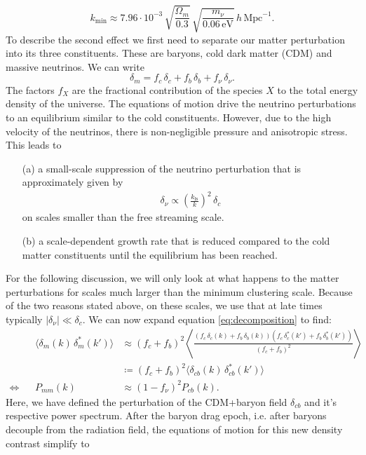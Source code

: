 \documentclass[../main.tex]{subfiles}
\begin{document}
\begin{equation}
    k_\mathrm{min} \approx 7.96\cdot10^{-3}\,\sqrt{\frac{\Omega_m}{0.3}}\,\sqrt{\frac{m_\nu}{0.06\,\mathrm{eV}}}\,h\,\mathrm{Mpc}^{-1}.
\end{equation}
To describe the second effect we first need to separate our matter perturbation into its three constituents. These are baryons, cold dark matter (CDM) and massive neutrinos. We can write 
\begin{equation}
    \label{eq:decomposition}
    \delta_m = f_c \,\delta_c + f_b\, \delta_b + f_\nu\,\delta_\nu.
\end{equation}
The factors $f_X$ are the fractional contribution of the species $X$ to the total energy density of the universe. The equations of motion drive the neutrino perturbations to an equilibrium similar to the cold constituents. However, due to the high velocity of the neutrinos, there is non-negligible pressure and anisotropic stress. 
This leads to \begin{itemize}
    \item[(a)] a small-scale suppression of the neutrino perturbation that is approximately given by 
    \begin{align*}
        \delta_\nu \propto \left(\frac{k_\mathrm{fs}}{k}\right)^2\,\delta_c
    \end{align*} 
    on scales smaller than the free streaming scale.
    \item[(b)] a scale-dependent growth rate that is reduced compared to the cold matter constituents until the equilibrium has been reached.
\end{itemize}
For the following discussion, we will only look at what happens to the matter perturbations for scales much larger than the minimum clustering scale. Because of the two reasons stated above, on these scales, we use that at late times typically $|\delta_\nu|\ll\delta_c$. We can now expand equation \ref{eq:decomposition} to find:
\begin{align}
 &&\langle \delta_m(k)\,\delta^*_m(k')\rangle &\approx (f_c+f_b)^2\left\langle\frac{(f_c \,\delta_c(k) + f_b\, \delta_b(k))(f_c \,\delta_c^*(k') + f_b\, \delta_b^*(k'))}{(f_c + f_b)^2}\right\rangle \nonumber\\
&&&\coloneqq (f_c+f_b)^2 \langle \delta_{cb}(k)\,\delta_{cb}^*(k') \rangle \\
\Longleftrightarrow && P_{mm}(k) &\approx (1-f_\nu)^2 P_{cb}(k).
\end{align}
Here, we have defined the perturbation of the CDM+baryon field $\delta_{cb}$ and it's respective power spectrum. After the baryon drag epoch, i.e. after baryons decouple from the radiation field, the equations of motion for this new density contrast simplify to 
\end{document}
